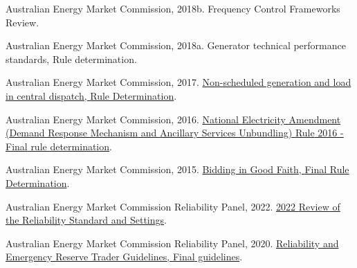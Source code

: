 \documentclass[12pt,a4paper,]{report}
\newlength{\cslhangindent}
\newenvironment{CSLReferences}[2] %
 {%
  \setlength{\parindent}{0pt}
  \ifodd #1 \everypar{\setlength{\hangindent}{\cslhangindent}}\ignorespaces\fi
  \ifnum #2 > 0
  \setlength{\parskip}{#2\baselineskip}
  \fi
 }%
 {}
\begin{document}
\begin{CSLReferences}{1}{0}
\leavevmode{}%
Australian Energy Market Commission, 2018b. Frequency {Control
Frameworks Review}.

\leavevmode{}%
Australian Energy Market Commission, 2018a. Generator technical
performance standards, {Rule} determination.

\leavevmode{}%
Australian Energy Market Commission, 2017.
\href{https://www.aemc.gov.au/sites/default/files/content/0bcaf68c-8449-4ce0-aaa6-da223ca6e01c/Final-Determination-ERC0203-Non-scheduled-generation-and-load.pdf}{Non-scheduled
generation and load in central dispatch, {Rule Determination}}.

\leavevmode{}%
Australian Energy Market Commission, 2016.
\href{https://www.aemc.gov.au/sites/default/files/content/68cb8114-113d-4d96-91dc-5cb4b0f9e0ae/ERC0186-DRM-and-ASU-Final-rule-determination-FINAL.PDF}{National
{Electricity Amendment} ({Demand Response Mechanism} and {Ancillary
Services Unbundling}) {Rule} 2016 - {Final} rule determination}.

\leavevmode{}%
Australian Energy Market Commission, 2015.
\href{https://www.aemc.gov.au/sites/default/files/content/815f277c-a015-47d0-bc13-ce3d5faaf96d/Final-Determination.pdf}{Bidding
in {Good Faith}, {Final Rule Determination}}.

\leavevmode{}%
Australian Energy Market Commission Reliability Panel, 2022.
\href{https://www.aemc.gov.au/sites/default/files/2022-09/2022\%20RSS\%20Review\%20Final\%20Report\%20\%281\%29.pdf}{2022
{Review} of the {Reliability Standard} and {Settings}}.

\leavevmode{}%
Australian Energy Market Commission Reliability Panel, 2020.
\href{https://www.aemc.gov.au/sites/default/files/2020-08/Updated\%20Amended\%20Panel\%20RERT\%20Guidelines\%20-\%2018\%20August\%202020\%20-\%20Final\%20for\%20publication_0.pdf}{Reliability
and {Emergency Reserve Trader Guidelines}, {Final} guidelines}.


\end{CSLReferences}
\end{document}
